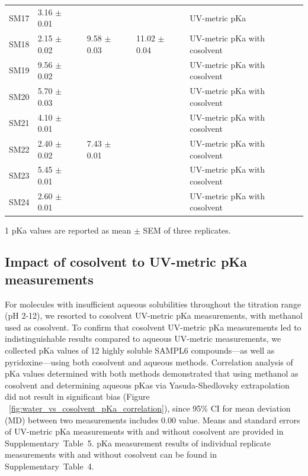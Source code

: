 \documentclass[9pt,lineno]{elife}
\begin{document}
\begin{table}[tb!]
\begin{center}
\begin{threeparttable}
\begin{tabular}{@{}lllll@{}}
SM17 & 3.16 $\pm$ 0.01 &  &  & UV-metric pKa \\
SM18 & 2.15 $\pm$ 0.02 & 9.58 $\pm$ 0.03 & 11.02 $\pm$ 0.04 & UV-metric pKa with cosolvent \\
SM19 & 9.56 $\pm$ 0.02 &  &  & UV-metric pKa with cosolvent \\
SM20 & 5.70 $\pm$ 0.03 &  &  & UV-metric pKa with cosolvent \\
SM21 & 4.10 $\pm$ 0.01 &  &  & UV-metric pKa with cosolvent \\
SM22 & 2.40 $\pm$ 0.02 & 7.43 $\pm$ 0.01 &  & UV-metric pKa with cosolvent \\
SM23 & 5.45 $\pm$ 0.01 &  &  & UV-metric pKa with cosolvent \\
SM24 & 2.60 $\pm$ 0.01 &  &  & UV-metric pKa with cosolvent \\ \bottomrule
\end{tabular}
\begin{tablenotes}
\item[1] pKa values are reported as mean $\pm$ SEM of three replicates.
\end{tablenotes}
\end{threeparttable}
\end{center}
\end{table}

\subsection{Impact of cosolvent to UV-metric pKa measurements}
For molecules with insufficient aqueous solubilities throughout the titration range (pH 2-12), we resorted to cosolvent UV-metric pKa measurements, with methanol used as cosolvent. 
To confirm that cosolvent UV-metric pKa measurements led to indistinguishable results compared to aqueous UV-metric measurements, we collected pKa values of 12 highly soluble SAMPL6 compounds---as well as pyridoxine---using both cosolvent and aqueous methods. 
Correlation analysis of pKa values determined with both methods demonstrated that using methanol as cosolvent and determining aqueous pKas via Yasuda-Shedlovsky extrapolation did not result in significant bias (Figure ~\ref{fig:water_vs_cosolvent_pKa_correlation}), since 95\% CI for mean deviation (MD) between two measurements includes 0.00 value.  
Means and standard errors of UV-metric pKa measurements with and without cosolvent are provided in Supplementary~Table~5. 
pKa measurement results of individual replicate measurements with and without cosolvent can be found in Supplementary~Table~4.
\end{document}
